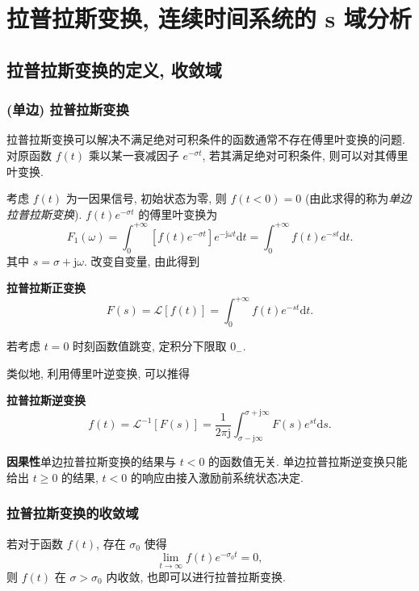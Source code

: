 \section{拉普拉斯变换, 连续时间系统的 s 域分析} \label{拉普拉斯变换, 连续时间系统的 s 域分析}
\subsection{拉普拉斯变换的定义, 收敛域} \label{4 拉普拉斯变换的定义, 收敛域}
\subsubsection{(单边) 拉普拉斯变换}
拉普拉斯变换可以解决不满足绝对可积条件的函数通常不存在傅里叶变换的问题. 对原函数 $f(t)$ 乘以某一衰减因子 $e^{-\sigma t}$, 若其满足绝对可积条件, 则可以对其傅里叶变换.

考虑 $f(t)$ 为一因果信号, 初始状态为零, 则 $f(t<0)=0$ (由此求得的称为\textit{单边拉普拉斯变换}). $f(t)e^{-\sigma t}$ 的傅里叶变换为
\begin{equation}
    F_1(\omega)=\int_{0}^{+\infty}[f(t)e^{-\sigma t}]e^{-\mathrm{j}\omega t}\mathrm{d}t=\int_{0}^{+\infty}f(t)e^{-st}\mathrm{d}t.
\end{equation}
其中 $s=\sigma+\mathrm{j}\omega$. 改变自变量, 由此得到

\textbf{拉普拉斯正变换}
\begin{equation} \label{4.1 laplace}
    F(s)=\mathcal{L}[f(t)]=\int_{0}^{+\infty}f(t)e^{-st}\mathrm{d}t.
\end{equation}

若考虑 $t=0$ 时刻函数值跳变, 定积分下限取 $0_-$.

类似地, 利用傅里叶逆变换, 可以推得

\textbf{拉普拉斯逆变换}
\begin{equation} \label{4.1 laplace inverse}
    f(t)=\mathcal{L}^{-1}[F(s)]=\frac{1}{2\pi\mathrm{j}}\int_{\sigma-\mathrm{j}\infty}^{\sigma+\mathrm{j}\infty}F(s)e^{st}\mathrm{d}s.
\end{equation}

\textbf{因果性}\quad 单边拉普拉斯变换的结果与 $t<0$ 的函数值无关. 单边拉普拉斯逆变换只能给出 $t\geq 0$ 的结果, $t<0$ 的响应由接入激励前系统状态决定.

\subsubsection{拉普拉斯变换的收敛域}
若对于函数 $f(t)$, 存在 $\sigma_0$ 使得
\begin{equation}
    \lim_{t\rightarrow\infty}f(t)e^{-\sigma_0 t}=0,
\end{equation}
则 $f(t)$ 在 $\sigma>\sigma_0$ 内收敛, 也即可以进行拉普拉斯变换.

